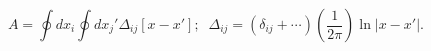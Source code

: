 \begin{equation}
\label{2darea}
A=\oint dx_i \oint dx_j' \Delta_{ij}[x-x'];\;\;\Delta_{ij}=(\delta_{ij}+\cdots)(\frac{1}{2\pi})\ln |x-x'|.
\end{equation} 
